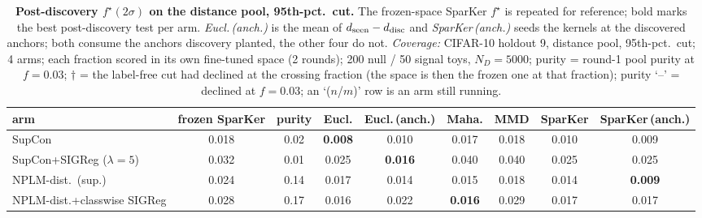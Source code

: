 \begin{table}[t]
\centering
\footnotesize
\begin{tabular}{lcccccccc}
\toprule
arm & frozen SparKer & purity & Eucl. & Eucl.\,(anch.) & Maha. & MMD & SparKer & SparKer\,(anch.) \\
\midrule
SupCon & 0.018 & 0.02 & \textbf{0.008} & 0.010 & 0.017 & 0.018 & 0.010 & 0.009 \\
\addlinespace
SupCon+SIGReg ($\lambda{=}5$) & 0.032 & 0.01 & 0.025 & \textbf{0.016} & 0.040 & 0.040 & 0.025 & 0.025 \\
\addlinespace
NPLM-dist.\ (sup.) & 0.024 & 0.14 & 0.017 & 0.014 & 0.015 & 0.018 & 0.014 & \textbf{0.009} \\
\addlinespace
NPLM-dist.+classwise SIGReg & 0.028 & 0.17 & 0.016 & 0.022 & \textbf{0.016} & 0.029 & 0.017 & 0.017 \\
\bottomrule
\end{tabular}
\caption{\textbf{Post-discovery $f^\star(2\sigma)$ on the distance pool, 95th-pct.\ cut.} The frozen-space SparKer $f^\star$ is repeated for reference; bold marks the best post-discovery test per arm. \emph{Eucl.\,(anch.)} is the mean of $d_{\rm seen}-d_{\rm disc}$ and \emph{SparKer\,(anch.)} seeds the kernels at the discovered anchors; both consume the anchors discovery planted, the other four do not. \emph{Coverage:} CIFAR-10 holdout 9, distance pool, 95th-pct.\ cut; 4 arms; each fraction scored in its own fine-tuned space (2 rounds); 200 null / 50 signal toys, $N_D{=}5000$; purity = round-1 pool purity at $f{=}0.03$; $\dagger$ = the label-free cut had declined at the crossing fraction (the space is then the frozen one at that fraction); purity `--' = declined at $f{=}0.03$; an `($n$/$m$)' row is an arm still running.}
\label{tab:sigma_post_cifar10_h9_quantile}
\end{table}
